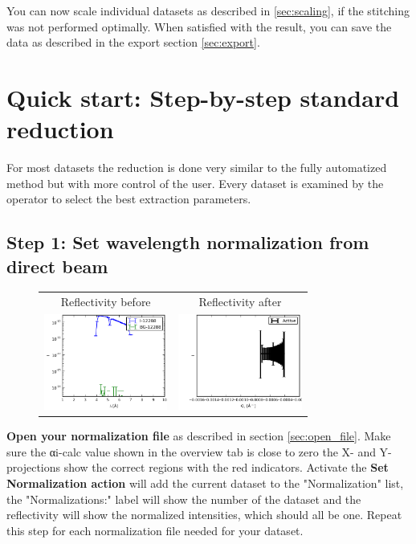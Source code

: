   
  You can now scale individual datasets as described in \ref{sec:scaling}, if the stitching was not performed optimally.
  When satisfied with the result, you can save the data as described in the export section \ref{sec:export}.
  

\section{Quick start: Step-by-step standard reduction}
\label{sec:quick_start}
  For most datasets the reduction is done very similar to the fully automatized method but with more control of the user.
  Every dataset is examined by the operator to select the best extraction parameters.
  
  \subsection{Step 1: Set wavelength normalization from direct beam}
    \begin{figure}
    \begin{tabular}{cc}
        Reflectivity before & Reflectivity after \\
      \includegraphics[width=115pt]{screenshots/normalize3.png} & \includegraphics[width=115pt]{screenshots/normalize_after.png}
    \end{tabular}     
    \end{figure}
  
        \textbf{Open your normalization file} as described in section \ref{sec:open_file}. 
      Make sure the αi-calc value shown in the overview tab is close to zero the X- and Y-projections show the correct regions with the red indicators.
      Activate the \textbf{Set Normalization action}  will add the current dataset to the "Normalization" list, the "Normalizations:" label will show the number of the dataset and the reflectivity will show the normalized intensities, which should all be one.
      Repeat this step for each normalization file needed for your dataset.


